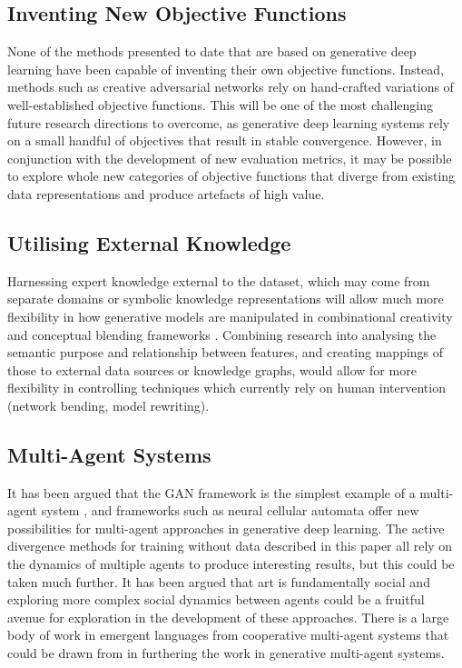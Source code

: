 \subsection{Inventing New Objective Functions}

None of the methods presented to date that are based on generative deep learning have been capable of inventing their own objective functions. Instead, methods such as creative adversarial networks \citep{elgammal2017can} rely on hand-crafted variations of well-established objective functions. 
This will be one of the most challenging future research directions to overcome, as generative deep learning systems rely on a small handful of objectives that result in stable convergence. 
However, in conjunction with the development of new evaluation metrics, it may be possible to explore whole new categories of objective functions that diverge from existing data representations and produce artefacts of high value. 

\subsection{Utilising External Knowledge}
\label{future:external}
Harnessing expert knowledge external to the dataset, which may come from separate domains or symbolic knowledge representations will allow much more flexibility in how generative models are manipulated in combinational creativity \citep{boden2004creative} and conceptual blending frameworks \citep{fauconnier2008way}. 
Combining research into analysing the semantic purpose and relationship between features, and creating mappings of those to external data sources or knowledge graphs, would allow for more flexibility in controlling techniques which currently rely on human intervention (network bending, model rewriting).

\subsection{Multi-Agent Systems}

It has been argued that the GAN framework is the simplest example of a multi-agent system \citep{arcas2019social}, and frameworks such as neural cellular automata \citep{mordvintsev2020growing} offer new possibilities for multi-agent approaches in generative deep learning. 
The active divergence methods for training without data described in this paper all rely on the dynamics of multiple agents to produce interesting results, but this could be taken much further. 
It has been argued that art is fundamentally social \citep{hertzmann2021social} and exploring more complex social dynamics between agents \citep{saunders2019multi} could be a fruitful avenue for exploration in the development of these approaches. 
There is a large body of work in emergent languages from cooperative multi-agent systems \citep{lazaridou2016multi} that could be drawn from in furthering the work in generative multi-agent systems. 

